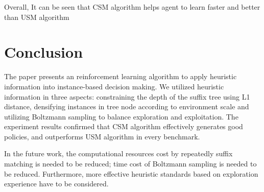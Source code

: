 \documentclass[conference]{IEEEtran}
\begin{document}
	Overall, It can be seen that CSM algorithm helps agent to learn faster and better than USM algorithm
	
	
	\section{Conclusion}
	
	The paper presents an reinforcement learning algorithm to apply heuristic information
	into instance-based decision making. We utilized heuristic information in three aspects: constraining the depth
	of the suffix tree using L1 distance, densifying instances in tree node according to environment scale 
	and utilizing Boltzmann sampling to balance exploration and exploitation. The experiment results
	confirmed that CSM algorithm effectively generates good policies, and outperforms USM algorithm in
	every benchmark.
	
	In the future work, the computational resources cost by repeatedly suffix matching
	is needed to be reduced; time cost of Boltzmann sampling is needed to be reduced.
	Furthermore, more effective heuristic standards based on exploration experience have
	to be considered. 
	
	
	
	
\end{document}
